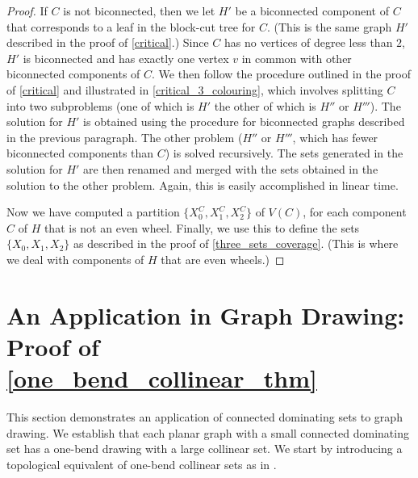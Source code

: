 \documentclass[11pt]{article}
\theoremstyle{definition}
\begin{document}
\begin{proof}
If $C$ is not biconnected, then we let $H'$ be a biconnected component of $C$ that corresponds to a leaf in the block-cut tree for $C$.  (This is the same graph $H'$ described in the proof of \cref{critical}.)  Since $C$ has no vertices of degree less than $2$, $H'$ is biconnected and has exactly one vertex $v$ in common with other biconnected components of $C$.  We then follow the procedure outlined in the proof of \cref{critical} and illustrated in \cref{critical_3_colouring}, which involves splitting $C$ into two subproblems (one of which is $H'$ the other of which is $H''$ or $H'''$).  The solution for $H'$ is obtained using the procedure for biconnected graphs described in the previous paragraph.  The other problem ($H''$ or $H'''$, which has fewer biconnected components than $C$) is solved recursively.  The sets generated in the solution for $H'$ are then renamed and merged with the sets obtained in the solution to the other problem.  Again, this is easily accomplished in linear time.

Now we have computed a partition $\{X^C_0,X^C_1,X^C_2\}$ of $V(C)$, for each component $C$ of $H$ that is not an even wheel.  Finally, we use this to define the sets $\{X_0,X_1,X_2\}$ as described in the proof of \cref{three_sets_coverage}.  (This is where we deal with components of $H$ that are even wheels.)
\end{proof}






\section{An Application in Graph Drawing: Proof of \cref{one_bend_collinear_thm}}
\label{one_bend}
This section demonstrates an application of connected dominating sets to graph drawing. We establish that each planar graph with a small connected dominating set has a one-bend drawing with a large collinear set. We start by introducing a topological equivalent of one-bend collinear sets as in \cite{DBLP:journals/jocg/LozzoDFMR18}.


\end{document}
